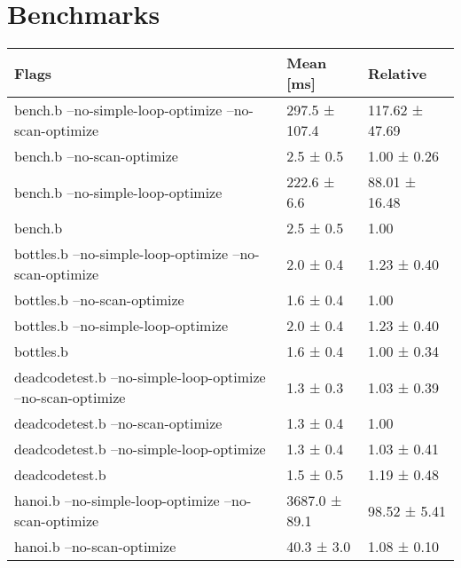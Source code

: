 \documentclass[11pt,answers]{exam}
\begin{document}
\pagebreak
\section{Benchmarks}
\begin{table}[H]
	\raggedright
	\begin{tabular}{|l|l|l|}
		\hline
		\textbf{Flags}                                              & \textbf{Mean [ms]} & \textbf{Relative} \\ \hline
		\hline
		bench.b --no-simple-loop-optimize --no-scan-optimize        & 297.5 ± 107.4      & 117.62 ± 47.69    \\ \hline
		bench.b --no-scan-optimize                                  & 2.5 ± 0.5          & 1.00 ± 0.26       \\ \hline
		bench.b --no-simple-loop-optimize                           & 222.6 ± 6.6        & 88.01 ± 16.48     \\ \hline
		bench.b                                                     & 2.5 ± 0.5          & 1.00              \\ \hline
		\hline
		bottles.b --no-simple-loop-optimize --no-scan-optimize      & 2.0 ± 0.4          & 1.23 ± 0.40       \\ \hline
		bottles.b --no-scan-optimize                                & 1.6 ± 0.4          & 1.00              \\ \hline
		bottles.b --no-simple-loop-optimize                         & 2.0 ± 0.4          & 1.23 ± 0.40       \\ \hline
		bottles.b                                                   & 1.6 ± 0.4          & 1.00 ± 0.34       \\ \hline
		\hline
		deadcodetest.b --no-simple-loop-optimize --no-scan-optimize & 1.3 ± 0.3          & 1.03 ± 0.39       \\ \hline
		deadcodetest.b --no-scan-optimize                           & 1.3 ± 0.4          & 1.00              \\ \hline
		deadcodetest.b --no-simple-loop-optimize                    & 1.3 ± 0.4          & 1.03 ± 0.41       \\ \hline
		deadcodetest.b                                              & 1.5 ± 0.5          & 1.19 ± 0.48       \\ \hline
		\hline
		hanoi.b --no-simple-loop-optimize --no-scan-optimize        & 3687.0 ± 89.1      & 98.52 ± 5.41      \\ \hline
		hanoi.b --no-scan-optimize                                  & 40.3 ± 3.0         & 1.08 ± 0.10       \\ \hline

\end{tabular}
\end{table}
\end{document}
